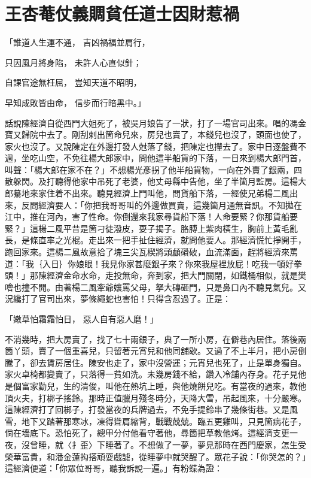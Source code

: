 %

\chapter{王杏菴仗義賙貧\KG 任道士因財惹禍}


「誰道人生運不通，  吉凶禍福並肩行，

只因風月將身陷，  未許人心直似針；

自課官途無枉屈，  豈知天道不昭明，

早知成敗皆由命，  信步而行暗黑中。」

話說陳經濟自從西門大姐死了，被吳月娘告了一狀，打了一場官司出來。唱的馮金寶又歸院中去了。剛刮剌出箇命兒來，房兒也賣了，本錢兒也沒了，頭面也使了，家火也沒了。又說陳定在外邊打發人尅落了錢，把陳定也攆去了。家中日逐盤費不週，坐吃山空，不免往楊大郎家中，問他這半船貨的下落，一日來到楊大郎門首，叫聲：「楊大郎在家不在？」不想楊光彥拐了他半船貨物，一向在外賣了銀兩，四散躲閃。及打聽得他家中吊死了老婆，他丈母縣中告他，坐了半箇月監房。這楊大郎驀地來家住着不出來。聽見經濟上門叫他，問貨船下落，一經使兄弟楊二風出來，反問經濟要人：「你把我哥哥叫的外邊做買賣，這幾箇月通無音訊。不知拋在江中，推在河內，害了性命。你倒還來我家尋貨船下落！人命要緊？你那貨船要緊？」這楊二風平昔是箇刁徒潑皮，耍子揭子。胳膊上紫肉橫生，胸前上黃毛亂長，是條直率之光棍。走出來一把手扯住經濟，就問他要人。那經濟慌忙掙開手，跑回家來。這楊二風故意拾了塊三尖瓦楔將頭顱礸破，血流滿面，趕將經濟來罵道：「我｛入日｝你娘眼！我見你家甚麼銀子來？你來我屋裡放屁！吃我一頓好拳頭！」那陳經濟金命水命，走投無命，奔到家，把大門關閉，如鐵桶相似，就是樊噲也撞不開。由著楊二風牽爺孃罵父母，拏大磚砸門，只是鼻口內不聽見氣兒。又況纔打了官司出來，夢條繩蛇也害怕！只得含忍過了。正是：

「嫩草怕霜霜怕日，  惡人自有惡人磨！」

不消幾時，把大房賣了，找了七十兩銀子，典了一所小房，在僻巷內居住。落後兩箇丫頭，賣了一個重喜兒，只留著元宵兒和他同舖歇。又過了不上半月，把小房倒騰了，卻去賃房居住。陳安也走了，家中沒營運；元宵兒也死了，止是單身獨自。家火卓椅都變賣了，只落得一貧如洗。未幾房錢不給，鑽入冷舖內存身。花子見他是個富家勤兒，生的清俊，叫他在熱坑上睡，與他燒餅兒吃。有當夜的過來，教他頂火夫，打梆子搖鈴。那時正值臘月殘冬時分，天降大雪，吊起風來，十分嚴寒。這陳經濟打了回梆子，打發當夜的兵牌過去，不免手提鈴串了幾條街巷。又是風雪，地下又踏著那寒冰，凍得聳肩縮背，戰戰兢兢。臨五更雞叫，只見箇病花子，倘在墻底下。恐怕死了，總甲分付他看守著他，尋箇把草教他烤。這經濟支更一夜，沒曾睡，就〈扌歪〉下睡著了。不想做了一夢，夢見那時在西門慶家，怎生受榮華富貴，和潘金蓮抅搭頑耍戲謔，從睡夢中就哭醒了。眾花子說：「你哭怎的？」這經濟便道：「你眾位哥哥，聽我訴說一遍。」有粉蝶為證：

